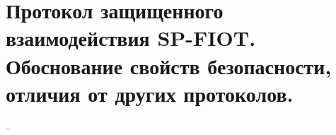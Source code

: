 \section{Протокол защищенного взаимодействия SP-FIOT. Обоснование свойств безопасности, отличия от других протоколов.}

--